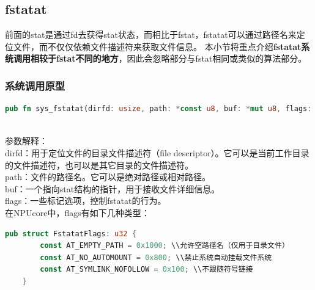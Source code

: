 \subsection{fstatat}
前面的stat是通过fd去获得stat状态，而相比于fstat，fstatat可以通过路径名来定位文件，而不仅仅依赖文件描述符来获取文件信息。
本小节将重点介绍\textbf{fstatat系统调用相较于fstat不同的地方}，因此会忽略部分与fstat相同或类似的算法部分。

\subsubsection{系统调用原型}
\begin{lstlisting}[language={Rust}, label={code:new_area},
	caption={os/src/syscall/fs.rs}]
    pub fn sys_fstatat(dirfd: usize, path: *const u8, buf: *mut u8, flags: u32);
\end{lstlisting}
\\
参数解释：\\
dirfd：用于定位文件的目录文件描述符（file descriptor）。它可以是当前工作目录的文件描述符，也可以是其它目录的文件描述符。\\
path：文件的路径名。它可以是绝对路径或相对路径。\\
buf：一个指向stat结构的指针，用于接收文件详细信息。\\
flags：一些标记选项，控制fstatat的行为。\\
在NPUcore中，flags有如下几种类型：
\begin{lstlisting}[language={Rust}, label={code:new_area},
	caption={NPUcore中的fstatat~flags选项}]
pub struct FstatatFlags: u32 {
        const AT_EMPTY_PATH = 0x1000; \\允许空路径名（仅用于目录文件）
        const AT_NO_AUTOMOUNT = 0x800; \\禁止系统自动挂载文件系统
        const AT_SYMLINK_NOFOLLOW = 0x100; \\不跟随符号链接
    }
\end{lstlisting}
